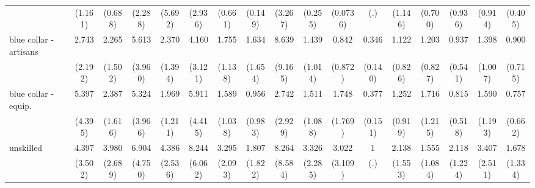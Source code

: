 {\begin{tabular}{l*{16}{c}}
                    &     (1.161)         &     (0.688)         &     (2.288)         &     (5.692)         &     (2.936)         &     (0.661)         &     (0.149)         &     (3.267)         &     (0.255)         &    (0.0736)         &         (.)         &     (1.146)         &     (0.700)         &     (0.936)         &     (0.914)         &     (0.405)         \\
[1em]
blue collar - artisans&       2.743         &       2.265         &       5.613\sym{*}  &       2.370         &       4.160         &       1.755         &       1.634         &       8.639\sym{*}  &       1.439         &       0.842         &       0.346\sym{**} &       1.122         &       1.203         &       0.937         &       1.398         &       0.900         \\
                    &     (2.192)         &     (1.502)         &     (3.960)         &     (1.394)         &     (3.121)         &     (1.138)         &     (1.654)         &     (9.165)         &     (1.014)         &     (0.872)         &     (0.140)         &     (0.826)         &     (0.827)         &     (0.541)         &     (1.007)         &     (0.715)         \\
[1em]
blue collar - equip.&       5.397\sym{*}  &       2.387         &       5.324\sym{*}  &       1.969         &       5.911\sym{*}  &       1.589         &       0.956         &       2.742         &       1.511         &       1.748         &       0.377\sym{*}  &       1.252         &       1.716         &       0.815         &       1.590         &       0.757         \\
                    &     (4.395)         &     (1.616)         &     (3.966)         &     (1.211)         &     (4.415)         &     (1.038)         &     (0.983)         &     (2.929)         &     (1.088)         &     (1.769)         &     (0.151)         &     (0.919)         &     (1.215)         &     (0.518)         &     (1.193)         &     (0.662)         \\
[1em]
unskilled           &       4.397         &       3.980\sym{*}  &       6.904\sym{**} &       4.386\sym{*}  &       8.244\sym{**} &       3.295         &       1.807         &       8.264\sym{*}  &       3.326         &       3.022         &           1         &       2.138         &       1.555         &       2.118         &       3.407         &       1.678         \\
                    &     (3.502)         &     (2.689)         &     (4.750)         &     (2.536)         &     (6.062)         &     (2.093)         &     (1.822)         &     (8.584)         &     (2.285)         &     (3.109)         &         (.)         &     (1.553)         &     (1.084)         &     (1.224)         &     (2.511)         &     (1.334)         \\

\end{tabular}}
